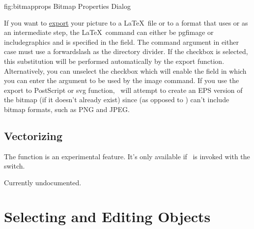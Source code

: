 \FloatFig
 {fig:bitmapprops}
 {}
 {Bitmap Properties Dialog}

If you want to \hyperref[sec:exportimage]{export} your picture to a \LaTeX\ file or
to a format that uses  or  as an intermediate
step, the \LaTeX\ command can either be \gls{pgfimage} or
\gls{includegraphics} and is specified in the
 field. The command argument in
either case must use a \gls{forwardslash} as the directory divider. If
the  \gls*{checkbox}
is selected, this substitution will be performed automatically by
the export function. Alternatively, you can unselect
the  \gls*{checkbox}
which will enable the
 field in which you
can enter the argument to be used by the image command. If you use the
export to PostScript or \gls{svg} function, \FlowframTk\ will
attempt to create an EPS version of the bitmap (if it doesn't
already exist) since  (as opposed to
) can't include bitmap formats, such as PNG and
JPEG.


\section{Vectorizing}\label{sec:vectorize}

The  function is an experimental
feature. It's only available if \FlowframTk\ is invoked with
the  switch.

Currently undocumented.


\chapter{Selecting and Editing Objects}\label{sec:selectobjects}


